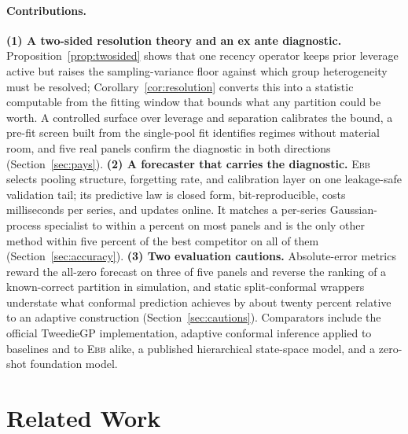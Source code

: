 \documentclass[twoside]{article}
\theoremstyle{definition}
\newcommand{\EBB}{\textsc{Ebb}}
\begin{document}
\paragraph{Contributions.}
\textbf{(1) A two-sided resolution theory and an ex ante diagnostic.}
Proposition~\ref{prop:twosided} shows that one recency operator keeps
prior leverage active but raises the sampling-variance floor against
which group heterogeneity must be resolved; Corollary~\ref{cor:resolution}
converts this into a statistic computable from the fitting window that
bounds what any partition could be worth. A controlled surface over
leverage and separation calibrates the bound, a pre-fit screen built from
the single-pool fit identifies regimes without material room, and five
real panels confirm the diagnostic in both directions
(Section~\ref{sec:pays}).
\textbf{(2) A forecaster that carries the diagnostic.} \EBB{} selects
pooling structure, forgetting rate, and calibration layer on one
leakage-safe validation tail; its predictive law is closed form,
bit-reproducible, costs milliseconds per series, and updates online. It
matches a per-series Gaussian-process specialist to within a percent on
most panels and is the only other method within five percent of the best
competitor on all of them (Section~\ref{sec:accuracy}).
\textbf{(3) Two evaluation cautions.} Absolute-error metrics reward the
all-zero forecast on three of five panels and reverse the ranking of a
known-correct partition in simulation, and static split-conformal
wrappers understate what conformal prediction achieves by about twenty
percent relative to an adaptive construction
(Section~\ref{sec:cautions}). Comparators include the official TweedieGP
implementation, adaptive conformal inference applied to baselines and to
\EBB{} alike, a published hierarchical state-space model, and a zero-shot
foundation model.

\section{Related Work}\label{sec:related}
\end{document}
